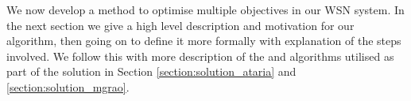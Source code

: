 We now develop a method to optimise multiple objectives in our WSN system. In the next section we give a high level description and motivation for our algorithm, then going on to define it more formally with explanation of the steps involved. We follow this with more description of the \acronymATARIA{}{} and \acronymMGRAO{}{} algorithms utilised as part of the solution in Section \ref{section:solution_ataria} and \ref{section:solution_mgrao}.
